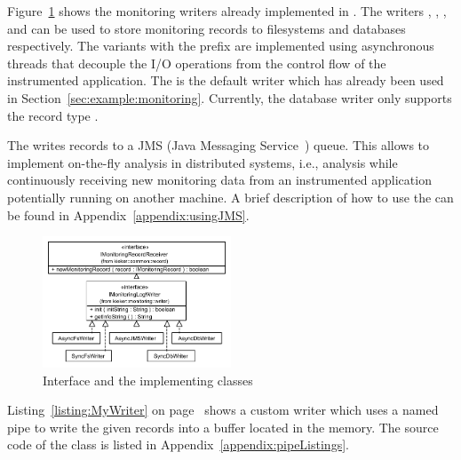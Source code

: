Figure~\ref{figure:monitoringLogWritersHierarchy} shows the monitoring writers %
already implemented in \KiekerMonitoringPart{}. The writers , %
, , and  can be used %
to store monitoring records to filesystems and databases respectively. %
The variants with the prefix  are implemented using asynchronous %
threads that decouple the I/O operations from the control flow of the %
instrumented application. %
The  is the default writer which has already been used in %
Section~\ref{sec:example:monitoring}. %
Currently, the database writer only supports the record type . %

The  writes records to a JMS (Java Messaging Service~\cite{JMS-WebSite}) queue. %
This allows to implement on-the-fly analysis in distributed systems, i.e., analysis while %
continuously receiving new monitoring data from an instrumented application potentially %
running on another machine. A brief description of how to use the  %
can be found in Appendix~\ref{appendix:usingJMS}. %

\begin{figure}[H]
\begin{centering}
\includegraphics[width=0.5\textwidth]{images/kieker_writerimplsuserguide-modified}
\caption{Interface  and  the implementing classes}
\label{figure:monitoringLogWritersHierarchy}
\end{centering}
\end{figure}

\noindent Listing~\ref{listing:MyWriter} on page~\pageref{listing:MyWriter} shows %
a custom writer  which uses a named pipe to %
write the given records into a buffer located in the memory. The source code of %
the class  is listed in Appendix~\ref{appendix:pipeListings}. %

\setJavaCodeListing


